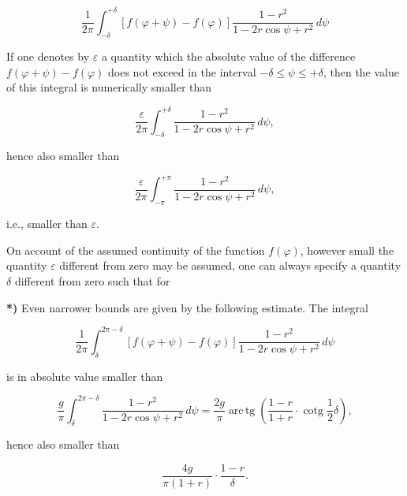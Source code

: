 \documentclass{article}
\begin{document}
\[

\frac{1}{2\pi} \int_{-\delta}^{+\delta} [f(\varphi + \psi) - f(\varphi)] \frac{1 - r^2}{1 - 2r \cos\psi + r^2}\,d\psi

\]



If one denotes by $\varepsilon$ a quantity which the absolute value of the difference $f(\varphi + \psi) - f(\varphi)$ does not exceed in the interval $-\delta \le \psi \le +\delta$, then the value of this integral is numerically smaller than

\[

\frac{\varepsilon}{2\pi} \int_{-\delta}^{+\delta} \frac{1 - r^2}{1 - 2r \cos\psi + r^2}\,d\psi,

\]

hence also smaller than

\[

\frac{\varepsilon}{2\pi} \int_{-\pi}^{+\pi} \frac{1 - r^2}{1 - 2r \cos\psi + r^2}\,d\psi,

\]

i.e., smaller than $\varepsilon$.



On account of the assumed continuity of the function $f(\varphi)$, however small the quantity $\varepsilon$ different from zero may be assumed, one can always specify a quantity $\delta$ different from zero such that for







\textbf{*)} Even narrower bounds are given by the following estimate. The integral

\[

\frac{1}{2\pi} \int_{\delta}^{2\pi - \delta} [f(\varphi + \psi) - f(\varphi)] \frac{1 - r^2}{1 - 2r \cos\psi + r^2}\,d\psi

\]

is in absolute value smaller than

\[

\frac{g}{\pi} \int_{\delta}^{2\pi - \delta} \frac{1 - r^2}{1 - 2r \cos\psi + r^2}\,d\psi = \frac{2g}{\pi} \operatorname{arc\,tg}\left(\frac{1 - r}{1 + r} \cdot \operatorname{cotg}\frac{1}{2}\delta\right),

\]

hence also smaller than

\[

\frac{4g}{\pi(1 + r)} \cdot \frac{1 - r}{\delta}.

\]
\end{document}
